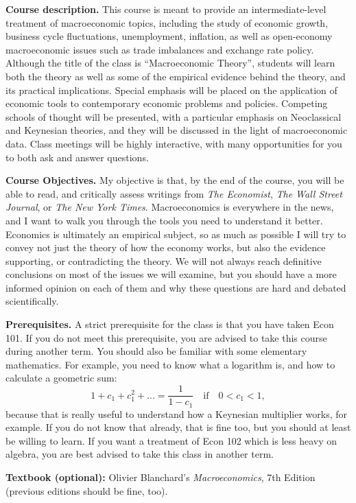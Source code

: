 \documentclass[]{book}
\theoremstyle{definition}
\theoremstyle{definition}
\theoremstyle{definition}
\theoremstyle{remark}
\begin{document}
\textbf{Course description.} This course is meant to provide an
intermediate-level treatment of macroeconomic topics, including the
study of economic growth, business cycle fluctuations, unemployment,
inflation, as well as open-economy macroeconomic issues such as trade
imbalances and exchange rate policy. Although the title of the class is
``Macroeconomic Theory'', students will learn both the theory as well as
some of the empirical evidence behind the theory, and its practical
implications. Special emphasis will be placed on the application of
economic tools to contemporary economic problems and policies. Competing
schools of thought will be presented, with a particular emphasis on
Neoclassical and Keynesian theories, and they will be discussed in the
light of macroeconomic data. Class meetings will be highly interactive,
with many opportunities for you to both ask and answer questions.

\textbf{Course Objectives.} My objective is that, by the end of the
course, you will be able to read, and critically assess writings from
\emph{The Economist}, \emph{The Wall Street Journal}, or \emph{The New
York Times}. Macroeconomics is everywhere in the news, and I want to
walk you through the tools you need to understand it better. Economics
is ultimately an empirical subject, so as much as possible I will try to
convey not just the theory of how the economy works, but also the
evidence supporting, or contradicting the theory. We will not always
reach definitive conclusions on most of the issues we will examine, but
you should have a more informed opinion on each of them and why these
questions are hard and debated scientifically.

\textbf{Prerequisites.} A strict prerequisite for the class is that you
have taken Econ 101. If you do not meet this prerequisite, you are
advised to take this course during another term. You should also be
familiar with some elementary mathematics. For example, you need to know
what a logarithm is, and how to calculate a geometric sum:
\[1+c_1+c_1^2+...=\frac{1}{1-c_1} \quad \text{if} \quad 0<c_1<1,\]
because that is really useful to understand how a Keynesian multiplier
works, for example. If you do not know that already, that is fine too,
but you should at least be willing to learn. If you want a treatment of
Econ 102 which is less heavy on algebra, you are best advised to take
this class in another term.

\textbf{Textbook (optional):} Olivier Blanchard's \emph{Macroeconomics},
7th Edition (previous editions should be fine, too).
\end{document}
